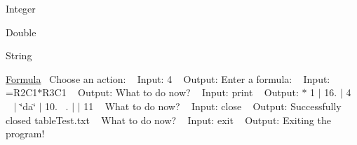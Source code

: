 \begin{DoxyEnumerate}
\item Integer~\newline

\item Double~\newline

\item String~\newline

\item \hyperlink{class_formula}{Formula}~\newline
 Choose an action\+: ~\newline
 Input\+: 4 ~\newline
 Output\+: Enter a formula\+: ~\newline
 Input\+: =R2\+C1$\ast$\+R3\+C1 ~\newline
 Output\+: What to do now? ~\newline
 Input\+: print ~\newline
 Output\+: $\ast$ 1 $\vert$ 16. $\vert$ 4 ~ $\vert$ \char`\"{}da\char`\"{} $\vert$ 10. ~. $\vert$ $\vert$ 11 ~\newline
 What to do now? ~\newline
 Input\+: close ~\newline
 Output\+: Successfully closed table\+Test.\+txt ~\newline
 What to do now? ~\newline
 Input\+: exit ~\newline
 Output\+: Exiting the program!~\newline
 
\end{DoxyEnumerate}